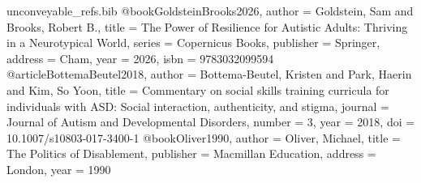 \begin{filecontents}[overwrite]{unconveyable_refs.bib}
@book{GoldsteinBrooks2026,
  author = {Goldstein, Sam and Brooks, Robert B.},
  title = {The Power of Resilience for Autistic Adults: Thriving in a Neurotypical World},
  series = {Copernicus Books}, publisher = {Springer}, address = {Cham}, year = {2026},
  isbn = {9783032099594}}
@article{BottemaBeutel2018,
  author = {Bottema-Beutel, Kristen and Park, Haerin and Kim, So Yoon},
  title = {Commentary on social skills training curricula for individuals with {ASD}: Social interaction, authenticity, and stigma},
  journal = {Journal of Autism and Developmental Disorders}, number = {3}, year = {2018},
  doi = {10.1007/s10803-017-3400-1}}
@book{Oliver1990,
  author = {Oliver, Michael},
  title = {The Politics of Disablement},
  publisher = {Macmillan Education}, address = {London}, year = {1990}}
\end{filecontents}

\documentclass[11pt]{article}
\usepackage[margin=1.1in]{geometry}
\usepackage[utf8]{inputenc}
\usepackage{amsmath, amssymb, amsthm}
\usepackage[hidelinks]{hyperref}
\usepackage{microtype}
\usepackage{booktabs}
\usepackage{array}
\usepackage{enumitem}
\usepackage{tikz}
\usetikzlibrary{arrows.meta, positioning, calc}
\usepackage[style=numeric, sorting=none, backend=bibtex]{biblatex}

\newcommand{\propositionautorefname}{Proposition}
\newcommand{\definitionautorefname}{Definition}
\newcommand{\hypothesisautorefname}{Hypothesis}
\newcommand{\corollaryautorefname}{Corollary}
\newcommand{\remarkautorefname}{Remark}
\renewcommand{\sectionautorefname}{Section}
\renewcommand{\subsectionautorefname}{Section}
\renewcommand{\figureautorefname}{Figure}

\newtheorem{proposition}{Proposition}
\newtheorem{corollary}{Corollary}
\theoremstyle{definition}
\newtheorem{definition}{Definition}
\newtheorem{hypothesis}{Hypothesis}
\newtheorem{assumption}{Premise}
\newtheorem{remark}{Remark}
\newcommand{\E}{\mathbb{E}}
\newcommand{\PP}{\mathbb{P}}

